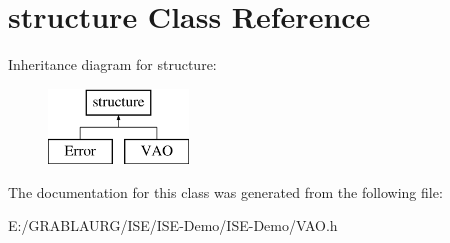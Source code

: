 \hypertarget{classstructure}{\section{structure Class Reference}
\label{classstructure}
}
Inheritance diagram for structure\-:\begin{figure}[H]
\begin{center}
\leavevmode
\includegraphics[height=2.000000cm]{classstructure}
\end{center}
\end{figure}


The documentation for this class was generated from the following file\-:\begin{DoxyCompactItemize}
\item 
E\-:/\-G\-R\-A\-B\-L\-A\-U\-R\-G/\-I\-S\-E/\-I\-S\-E-\/\-Demo/\-I\-S\-E-\/\-Demo/V\-A\-O.\-h\end{DoxyCompactItemize}
